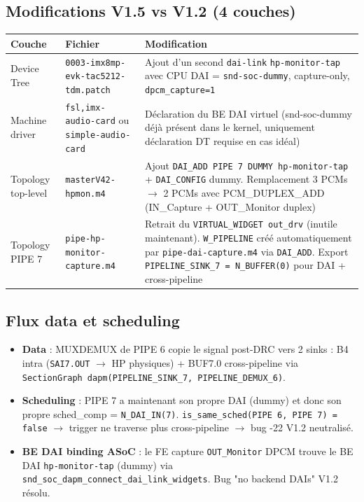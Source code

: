 \documentclass[11pt,a4paper]{article}
\begin{document}
\subsection{Modifications V1.5 vs V1.2 (4 couches)}

\begin{center}
\begin{tabularx}{\textwidth}{llX}
\toprule
\textbf{Couche} & \textbf{Fichier} & \textbf{Modification} \\
\midrule
Device Tree & \texttt{0003-imx8mp-evk-tac5212-tdm.patch} & Ajout d'un second \texttt{dai-link} \texttt{hp-monitor-tap} avec CPU DAI = \texttt{snd-soc-dummy}, capture-only, \texttt{dpcm\_capture=1} \\
Machine driver & \texttt{fsl,imx-audio-card} ou \texttt{simple-audio-card} & Déclaration du BE DAI virtuel (snd-soc-dummy déjà présent dans le kernel, uniquement déclaration DT requise en cas idéal) \\
Topology top-level & \texttt{masterV42-hpmon.m4} & Ajout \texttt{DAI\_ADD PIPE 7 DUMMY hp-monitor-tap} + \texttt{DAI\_CONFIG} dummy. Remplacement 3 PCMs $\to$ 2 PCMs avec PCM\_DUPLEX\_ADD (IN\_Capture + OUT\_Monitor duplex) \\
Topology PIPE 7 & \texttt{pipe-hp-monitor-capture.m4} & Retrait du \texttt{VIRTUAL\_WIDGET out\_drv} (inutile maintenant). \texttt{W\_PIPELINE} créé automatiquement par \texttt{pipe-dai-capture.m4} via \texttt{DAI\_ADD}. Export \texttt{PIPELINE\_SINK\_7 = N\_BUFFER(0)} pour DAI + cross-pipeline \\
\bottomrule
\end{tabularx}
\end{center}

\subsection{Flux data et scheduling}

\begin{itemize}[leftmargin=*, itemsep=1pt]
  \item \textbf{Data} : MUXDEMUX de PIPE 6 copie le signal post-DRC vers 2 sinks : B4 intra (\texttt{SAI7.OUT} $\to$ HP physiques) + BUF7.0 cross-pipeline via \texttt{SectionGraph dapm(PIPELINE\_SINK\_7, PIPELINE\_DEMUX\_6)}.
  \item \textbf{Scheduling} : PIPE 7 a maintenant son propre DAI (dummy) et donc son propre sched\_comp = \texttt{N\_DAI\_IN(7)}. \texttt{is\_same\_sched(PIPE 6, PIPE 7) = false} $\to$ trigger ne traverse plus cross-pipeline $\to$ bug -22 V1.2 neutralisé.
  \item \textbf{BE DAI binding ASoC} : le FE capture \texttt{OUT\_Monitor} DPCM trouve le BE DAI \texttt{hp-monitor-tap} (dummy) via \texttt{snd\_soc\_dapm\_connect\_dai\_link\_widgets}. Bug "no backend DAIs" V1.2 résolu.
\end{itemize}
\end{document}
